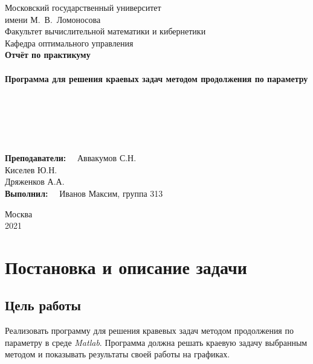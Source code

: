 \documentclass{article}
\begin{document}
\begin{titlepage}
    \begin{center}
	{\small \sc Московский государственный университет \\имени М.~В.~Ломоносова\\
	Факультет вычислительной математики и кибернетики\\
	Кафедра оптимального управления\\}
	\vfill
	\vspace{5cm}
	{\Large \bf Отчёт по практикуму}\\
	~\\
	{\large \bf Программа для решения краевых задач методом продолжения по параметру{}}\\
	~\\
	~\\
	~\\
	~\\
	~\\
	\vspace{5cm}
	\begin{flushright}
	    \textbf{Преподаватели:}$\quad$ Аввакумов С.Н.\\ Киселев Ю.Н.\\ Дряженков А.А.\\
	    \vspace{0,5cm}
        \textbf{Выполнил:}$\quad$	Иванов Максим, группа 313
	\end{flushright}
    \end{center}
    \begin{center}
	\vfill
	{\small Москва\\2021}
    \end{center}
\end{titlepage}

\tableofcontents

\newpage

\section{Постановка и описание задачи}

\subsection{Цель работы}

Реализовать программу для решения кравевых задач методом продолжения по параметру в среде \textit{Matlab}.
Программа должна решать краевую задачу выбранным методом и показывать результаты своей работы на графиках.
\end{document}
